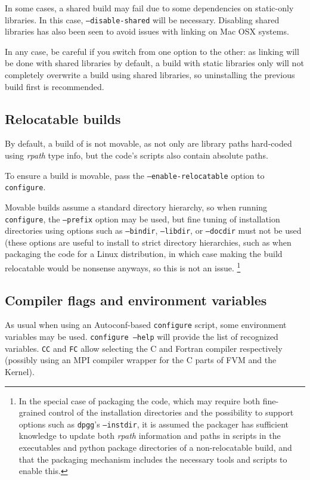 \documentclass[a4paper,10pt,twoside]{csshortdoc}
\begin{document}
In some cases, a shared build may fail due to some dependencies
on static-only libraries. In this case, {\tt --disable-shared}
will be necessary. Disabling shared libraries has also been seen
to avoid issues with linking on Mac OSX systems.

In any case, be careful if you switch from one option to the other: as
linking will be done with shared libraries by default, a build
with static libraries only will not completely overwrite a build using
shared libraries, so uninstalling the previous build first
is recommended.

\subsection{Relocatable builds\label{sec:config:relocatable}}

By default, a build of \CS is not movable, as not only
are library paths hard-coded using \emph{rpath} type info,
but the code's scripts also contain absolute paths.

To ensure a build is movable, pass the \texttt{--enable-relocatable} option
to {\tt configure}.

Movable builds assume a standard directory hierarchy, so when running
{\tt configure}, the \texttt{--prefix} option may be used, but fine tuning
of installation directories using options such as \texttt{--bindir},
\texttt{--libdir}, or \texttt{--docdir} must not be used
(these options are useful to install to strict directory hierarchies,
such as when packaging the code for a Linux distribution,
in which case making the build relocatable would be nonsense anyways,
so this is not an issue.
\footnote{In the special case of packaging the code, which
may require both fine-grained control of the installation directories
and the possibility to support options such as \texttt{dpgg}'s
\texttt{--instdir}, it is assumed the packager has sufficient knowledge to
update both \emph{rpath} information and paths in scripts in the executables
and python package directories of a non-relocatable build, and that the
packaging mechanism includes the necessary tools and scripts to enable this.}

\subsection{Compiler flags and environment variables\label{sec:config:flags}}

As usual when using an Autoconf-based \texttt{configure} script,
some environment variables may be used. \texttt{configure --help}
will provide the list of recognized variables.
\texttt{CC} and \texttt{FC} allow selecting the C and Fortran compiler
respectively (possibly using an MPI compiler wrapper for the C parts
of FVM and the Kernel).
\end{document}
